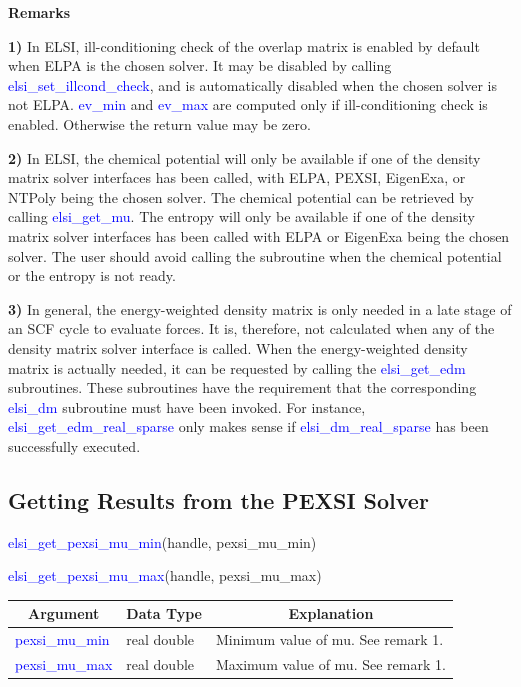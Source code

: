 \documentclass{report}
\begin{document}
\textbf{Remarks}

\textbf{1)} In ELSI, ill-conditioning check of the overlap matrix is enabled by default when ELPA is the chosen solver. It may be disabled by calling \textcolor{blue}{elsi\_set\_illcond\_check}, and is automatically disabled when the chosen solver is not ELPA. \textcolor{blue}{ev\_min} and \textcolor{blue}{ev\_max} are computed only if ill-conditioning check is enabled. Otherwise the return value may be zero.

\textbf{2)} In ELSI, the chemical potential will only be available if one of the density matrix solver interfaces has been called, with ELPA, PEXSI, EigenExa, or NTPoly being the chosen solver. The chemical potential can be retrieved by calling \textcolor{blue}{elsi\_get\_mu}. The entropy will only be available if one of the density matrix solver interfaces has been called with ELPA or EigenExa being the chosen solver. The user should avoid calling the subroutine when the chemical potential or the entropy is not ready.

\textbf{3)} In general, the energy-weighted density matrix is only needed in a late stage of an SCF cycle to evaluate forces. It is, therefore, not calculated when any of the density matrix solver interface is called. When the energy-weighted density matrix is actually needed, it can be requested by calling the \textcolor{blue}{elsi\_get\_edm} subroutines. These subroutines have the requirement that the corresponding \textcolor{blue}{elsi\_dm} subroutine must have been invoked. For instance, \textcolor{blue}{elsi\_get\_edm\_real\_sparse} only makes sense if \textcolor{blue}{elsi\_dm\_real\_sparse} has been successfully executed.

\subsection{Getting Results from the PEXSI Solver}
\label{subsec:getter_pexsi}
\begin{labeling}{\hspace{6cm}}
\item [\hspace{0.3cm} \textcolor{blue}{elsi\_get\_pexsi\_mu\_min}(handle, pexsi\_mu\_min)]
\item [\hspace{0.3cm} \textcolor{blue}{elsi\_get\_pexsi\_mu\_max}(handle, pexsi\_mu\_max)]
\end{labeling}

\begin{tabular}[]{|p{30mm}|p{45mm}|p{90mm}|}
\hline
\multicolumn{1}{|c|}{\textbf{Argument}} & \multicolumn{1}{c|}{\textbf{Data Type}} & \multicolumn{1}{c|}{\textbf{Explanation}}\\
\hline
\textcolor{blue}{pexsi\_mu\_min} & real double & Minimum value of mu. See remark 1.\\
\hline
\textcolor{blue}{pexsi\_mu\_max} & real double & Maximum value of mu. See remark 1.\\
\hline
\end{tabular}
\end{document}
